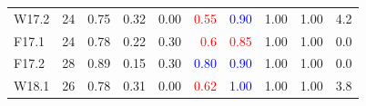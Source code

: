 \documentclass{article}\usepackage[]{graphicx}\usepackage[]{color}
\begin{document}
\begin{table}[h]
\begin{tabular}{lrrrrrrrrr}
  W17.2 & 24 & 0.75 & 0.32 & 0.00 & \textcolor{red}{                   0.55} & \textcolor{red}{\textcolor{blue}{0.90}} & 1.00 & 1.00 & 4.2 \\ 
  F17.1 & 24 & 0.78 & 0.22 & 0.30 & \textcolor{red}{                    0.6} & \textcolor{red}{                   0.85} & 1.00 & 1.00 & 0.0 \\ 
  F17.2 & 28 & 0.89 & 0.15 & 0.30 & \textcolor{red}{\textcolor{blue}{0.80}} & \textcolor{red}{\textcolor{blue}{0.90}} & 1.00 & 1.00 & 0.0 \\ 
  W18.1 & 26 & 0.78 & 0.31 & 0.00 & \textcolor{red}{                   0.62} & \textcolor{red}{\textcolor{blue}{1.00}} & 1.00 & 1.00 & 3.8 \\ 
   \hline
\end{tabular}
\end{table}
\end{document}
